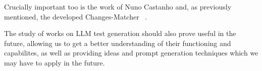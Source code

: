 Crucially important too is the work of Nuno Castanho and, as previously mentioned, the developed Changes-Matcher ~\citep{kn:nuno}.

The study of works on LLM test generation should also prove useful in the future, allowing us to get a better understanding of their functioning and capabilites, as well as providing ideas and prompt generation techniques which we may have to apply in the future.